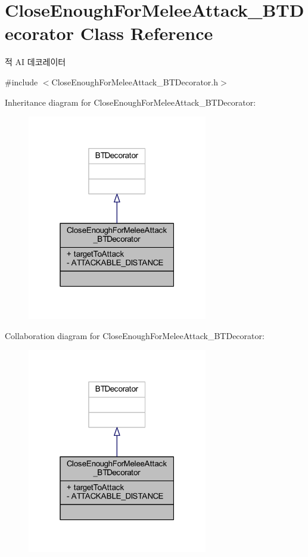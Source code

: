 \hypertarget{class_close_enough_for_melee_attack___b_t_decorator}{}\section{Close\+Enough\+For\+Melee\+Attack\+\_\+\+B\+T\+Decorator Class Reference}
\label{class_close_enough_for_melee_attack___b_t_decorator}


적 AI 데코레이터  




{\ttfamily \#include $<$Close\+Enough\+For\+Melee\+Attack\+\_\+\+B\+T\+Decorator.\+h$>$}



Inheritance diagram for Close\+Enough\+For\+Melee\+Attack\+\_\+\+B\+T\+Decorator\+:
\nopagebreak
\begin{figure}[H]
\begin{center}
\leavevmode
\includegraphics[width=223pt]{class_close_enough_for_melee_attack___b_t_decorator__inherit__graph}
\end{center}
\end{figure}


Collaboration diagram for Close\+Enough\+For\+Melee\+Attack\+\_\+\+B\+T\+Decorator\+:
\nopagebreak
\begin{figure}[H]
\begin{center}
\leavevmode
\includegraphics[width=223pt]{class_close_enough_for_melee_attack___b_t_decorator__coll__graph}
\end{center}
\end{figure}
